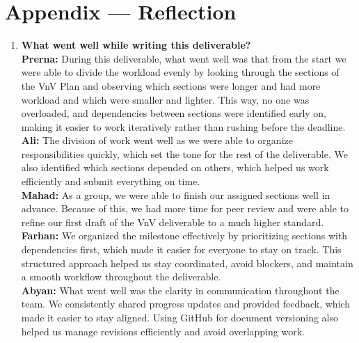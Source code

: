 \documentclass[12pt, titlepage]{article}
\begin{document}
\newpage{}
\section*{Appendix --- Reflection}

\begin{enumerate}
  \item \textbf{What went well while writing this deliverable?} \\[3pt]
  \textbf{Prerna:} During this deliverable, what went well was that from the start we were able to divide the workload evenly by looking through the sections of the VnV Plan and observing which sections were longer and had more workload and which were smaller and lighter. This way, no one was overloaded, and dependencies between sections were identified early on, making it easier to work iteratively rather than rushing before the deadline.\\[5pt]
  \textbf{Ali:} The division of work went well as we were able to organize responsibilities quickly, which set the tone for the rest of the deliverable. We also identified which sections depended on others, which helped us work efficiently and submit everything on time.\\[5pt]
  \textbf{Mahad:} As a group, we were able to finish our assigned sections well in advance. Because of this, we had more time for peer review and were able to refine our first draft of the VnV deliverable to a much higher standard.\\[5pt]
  \textbf{Farhan:} We organized the milestone effectively by prioritizing sections with dependencies first, which made it easier for everyone to stay on track. This structured approach helped us stay coordinated, avoid blockers, and maintain a smooth workflow throughout the deliverable.\\[5pt]
  \textbf{Abyan:} What went well was the clarity in communication throughout the team. We consistently shared progress updates and provided feedback, which made it easier to stay aligned. Using GitHub for document versioning also helped us manage revisions efficiently and avoid overlapping work.


\end{enumerate}
\end{document}

